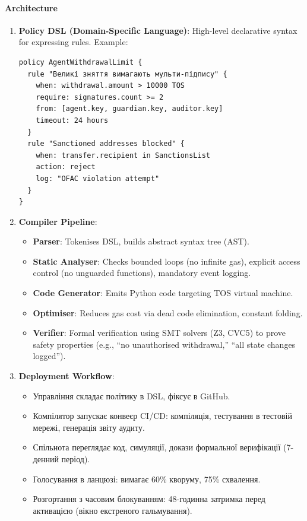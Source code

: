 \documentclass[11pt]{article}
\begin{document}
\paragraph{Architecture}
\begin{enumerate}[noitemsep]
  \item \textbf{Policy DSL (Domain-Specific Language)}: High-level declarative syntax for expressing rules. Example:
  \begin{verbatim}
policy AgentWithdrawalLimit {
  rule "Великі зняття вимагають мульти-підпису" {
    when: withdrawal.amount > 10000 TOS
    require: signatures.count >= 2
    from: [agent.key, guardian.key, auditor.key]
    timeout: 24 hours
  }
  rule "Sanctioned addresses blocked" {
    when: transfer.recipient in SanctionsList
    action: reject
    log: "OFAC violation attempt"
  }
}
  \end{verbatim}
  \item \textbf{Compiler Pipeline}:
    \begin{itemize}[noitemsep]
      \item \textbf{Parser}: Tokenises DSL, builds abstract syntax tree (AST).
      \item \textbf{Static Analyser}: Checks bounded loops (no infinite gas), explicit access control (no unguarded functions), mandatory event logging.
      \item \textbf{Code Generator}: Emits Python code targeting TOS virtual machine.
      \item \textbf{Optimiser}: Reduces gas cost via dead code elimination, constant folding.
      \item \textbf{Verifier}: Formal verification using SMT solvers (Z3, CVC5) to prove safety properties (e.g., ``no unauthorised withdrawal,'' ``all state changes logged'').
    \end{itemize}
  \item \textbf{Deployment Workflow}:
    \begin{itemize}[noitemsep]
      \item Управління складає політику в DSL, фіксує в GitHub.
      \item Компілятор запускає конвеєр CI/CD: компіляція, тестування в тестовій мережі, генерація звіту аудиту.
      \item Спільнота переглядає код, симуляції, докази формальної верифікації (7-денний період).
      \item Голосування в ланцюзі: вимагає 60\% кворуму, 75\% схвалення.
      \item Розгортання з часовим блокуванням: 48-годинна затримка перед активацією (вікно екстреного гальмування).
    \end{itemize}
\end{enumerate}
\end{document}
